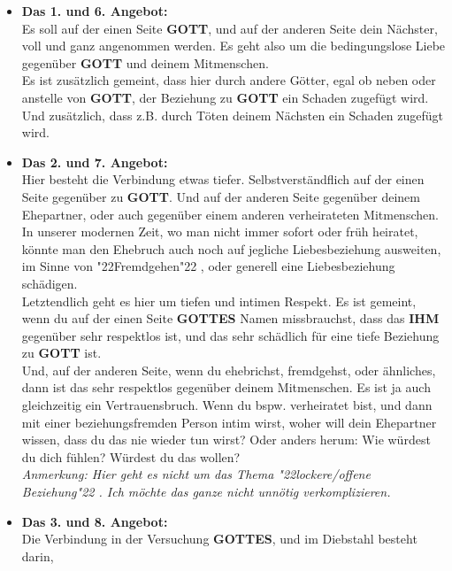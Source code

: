 \documentclass[12pt,a5paper]{article}
\newcommand{\Gottes}[0]{\textbf{GOTTES}}
\newcommand{\Gott}[0]{\textbf{GOTT}}
\newcommand{\Ihm}[0]{\textbf{IHM}}
\newcommand{\q}[1]{\char"22{#1}\char"22 }
\begin{document}
		\begin{itemize}
			\item	\textbf{Das 1. und 6. Angebot:}
					\\
					Es soll auf der einen Seite {\Gott},
					und auf der anderen Seite dein N\"achster,
					voll und ganz angenommen werden.
					Es geht also um die bedingungslose Liebe gegen\"uber {\Gott} und deinem Mitmenschen.
					\\
					Es ist zus\"atzlich gemeint,
					dass hier durch andere G\"otter,
					egal ob neben oder anstelle von {\Gott},
					der Beziehung zu {\Gott} ein Schaden zugef\"ugt wird.
					Und zus\"atzlich,
					dass z.B. durch T\"oten deinem N\"achsten ein Schaden zugef\"ugt wird.
			\item	\textbf{Das 2. und 7. Angebot:}
					\\
					Hier besteht die Verbindung etwas tiefer.
					Selbstverst\"andflich auf der einen Seite gegen\"uber zu {\Gott}.
					Und auf der anderen Seite gegen\"uber deinem Ehepartner,
					oder auch gegen\"uber einem anderen verheirateten Mitmenschen.
					In unserer modernen Zeit,
					wo man nicht immer sofort oder fr\"uh heiratet,
					k\"onnte man den Ehebruch auch noch auf jegliche Liebesbeziehung ausweiten,
					im Sinne von \q{Fremdgehen},
					oder generell eine Liebesbeziehung sch\"adigen.
					\\
					Letztendlich geht es hier um tiefen und intimen Respekt.
					Es ist gemeint,
					wenn du auf der einen Seite {\Gottes} Namen missbrauchst,
					dass das {\Ihm} gegen\"uber sehr respektlos ist,
					und das sehr sch\"adlich f\"ur eine tiefe Beziehung zu {\Gott} ist.
					\\
					Und,
					auf der anderen Seite,
					wenn du ehebrichst,
					fremdgehst,
					oder \"ahnliches,
					dann ist das sehr respektlos gegen\"uber deinem Mitmenschen.
					Es ist ja auch gleichzeitig ein Vertrauensbruch.
					Wenn du bspw. verheiratet bist,
					und dann mit einer beziehungsfremden Person intim wirst,
					woher will dein Ehepartner wissen,
					dass du das nie wieder tun wirst?
					Oder anders herum:
					Wie w\"urdest du dich f\"uhlen?
					W\"urdest du das wollen?
					\\
					\textit{Anmerkung:
					Hier geht es nicht um das Thema \q{lockere/offene Beziehung}.
					Ich m\"ochte das ganze nicht unn\"otig verkomplizieren.}
			\item	\textbf{Das 3. und 8. Angebot:}
					\\
					Die Verbindung in der Versuchung {\Gottes},
					und im Diebstahl besteht darin,

\end{itemize}
\end{document}
